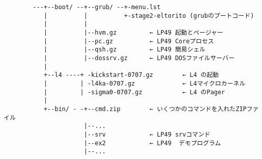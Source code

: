 {\small
\begin{verbatim}
        ---+--boot/ --+--grub/ --+-menu.lst
           |          |          +-stage2-eltorito (grubのプートコード)
           |          |                  
           |          |--hvm.gz         ← LP49 起動とページャー
           |          |--pc.gz          ← LP49 Coreプロセス
           |          |--qsh.gz         ← LP49 簡易シェル       
           |          |--dossrv.gz      ← LP49 DOSファイルサーバー
           |                                
           +--l4 ----+ -kickstart-0707.gz        ← L4 の起動
           |         | -l4ka-0707.gz             ← L4マイクロカーネル 
           |         | -sigma0-0707.gz           ← L4 のPager
           |                                
           +--bin/ - -+--cmd.zip        ← いくつかのコマンドを入れたZIPファイル 
                      |--...            
                      |--srv            ← LP49 srvコマンド
                      |--ex2            ← LP49  デモプログラム   
                      |--... 
\end{verbatim}     
}


